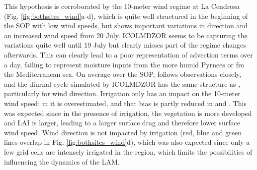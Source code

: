 This hypothesis is corroborated by the 10-meter wind regime at La Cendrosa (Fig. \ref{fig:bothsites_wind}a-d), which is quite well structured in the beginning of the SOP with low wind speeds, but shows important variations in direction and an increased wind speed from 20 July. ICOLMDZOR seems to be capturing the variations quite well until 19 July but clearly misses part of the regime changes afterwards. This can clearly lead to a poor representation of advection terms over a day, failing to represent moisture inputs from the more humid Pyrnees or fro the Mediterranean sea.
On average over the SOP, \mesoexact follows observations closely, and the diurnal cycle simulated by ICOLMDZOR has the same structure as \mesomean, particularly for wind direction.
Irrigation only has an impact on the 10-meter wind speed: in \noirr it is overestimated, and that bias is partly reduced in \irr and \irrboost. This was expected since in the presence of irrigation, the vegetation is more developed and LAI is larger, leading to a larger surface drag and therefore lower surface wind speed. 
Wind direction is not impacted by irrigation (red, blue and green lines overlap in Fig. \ref{fig:bothsites_wind}d), which was also expected since only a few grid cells are intensely irrigated in the region, which limits the possibilities of influencing the dynamics of the LAM.

